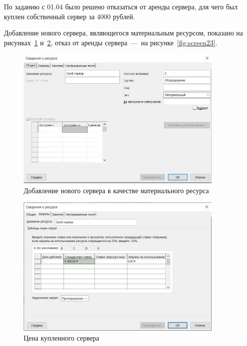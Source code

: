 По заданию с 01.04 было решено отказаться от аренды сервера, для чего был куплен собственный сервер за 4000 рублей.

Добавление нового сервера, являющегося материальным ресурсом, показано на рисунках~\ref{fig:screen21} и~\ref{fig:screen22}, отказ от аренды сервера~---~на рисунке~\ref{fig:screen23}.

\begin{figure}[H]
	\centering
	\includegraphics[width=0.9\textwidth]{img/screen21.jpg}
	\caption{Добавление нового сервера в качестве материального ресурса}
	\label{fig:screen21}
\end{figure}

\begin{figure}[H]
	\centering
	\includegraphics[width=0.9\textwidth]{img/screen22.jpg}
	\caption{Цена купленного сервера}
	\label{fig:screen22}
\end{figure}

